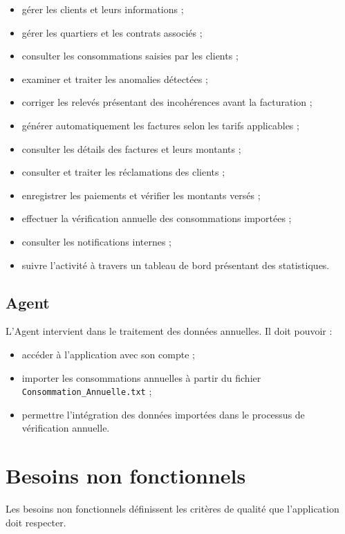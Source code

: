 \begin{itemize}[leftmargin=*]
    \item gérer les clients et leurs informations ;
    \item gérer les quartiers et les contrats associés ;
    \item consulter les consommations saisies par les clients ;
    \item examiner et traiter les anomalies détectées ;
    \item corriger les relevés présentant des incohérences avant la facturation ;
    \item générer automatiquement les factures selon les tarifs applicables ;
    \item consulter les détails des factures et leurs montants ;
    \item consulter et traiter les réclamations des clients ;
    \item enregistrer les paiements et vérifier les montants versés ;
    \item effectuer la vérification annuelle des consommations importées ;
    \item consulter les notifications internes ;
    \item suivre l'activité à travers un tableau de bord présentant des statistiques.
\end{itemize}

\subsection{Agent}

L'Agent intervient dans le traitement des données annuelles. Il doit pouvoir :

\begin{itemize}[leftmargin=*]
    \item accéder à l'application avec son compte ;
    \item importer les consommations annuelles à partir du fichier \texttt{Consommation\_Annuelle.txt} ;
    \item permettre l'intégration des données importées dans le processus de vérification annuelle.
\end{itemize}

\section{Besoins non fonctionnels}

Les besoins non fonctionnels définissent les critères de qualité que l'application doit respecter.


